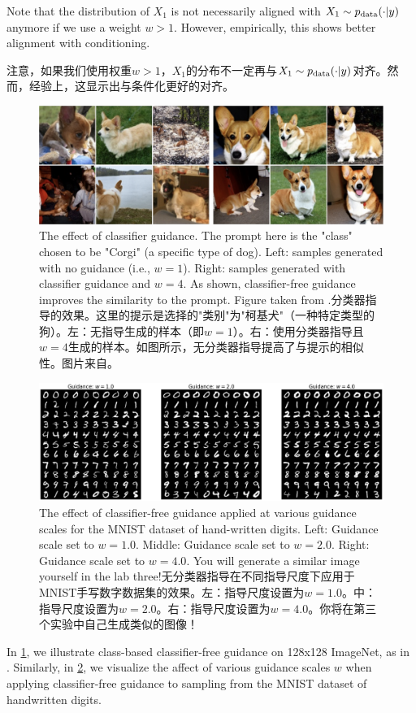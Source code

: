 Note that the distribution of $X_1$ is not necessarily aligned with $X_1 \sim  p_{\rm{data}}(\cdot | y)$ anymore if we use a weight $w>1$. However, empirically, this shows better alignment with conditioning.

注意，如果我们使用权重$w>1$，$X_1$的分布不一定再与$X_1 \sim  p_{\rm{data}}(\cdot | y)$对齐。然而，经验上，这显示出与条件化更好的对齐。
\begin{figure}[!t]
    \centering
    \includegraphics[width=\linewidth]{figures/salimans_cfg.png}
    \caption{The effect of classifier guidance. The prompt here is the "class" chosen to be "Corgi" (a specific type of dog). Left: samples generated with no guidance (i.e., $w = 1$). Right: samples generated with classifier guidance and $w = 4$. As shown, classifier-free guidance improves the similarity to the prompt. Figure taken from \cite{cfg}.分类器指导的效果。这里的提示是选择的"类别"为"柯基犬"（一种特定类型的狗）。左：无指导生成的样本（即$w = 1$）。右：使用分类器指导且$w = 4$生成的样本。如图所示，无分类器指导提高了与提示的相似性。图片来自\cite{cfg}。}
    \label{fig:guidance}
\end{figure}

\begin{figure}[!t]
    \centering
    \includegraphics[width=\linewidth]{figures/guidance.png}
    \caption{The effect of classifier-free guidance applied at various guidance scales for the MNIST dataset of hand-written digits. Left: Guidance scale set to $w = 1.0$. Middle: Guidance scale set to $w = 2.0$. Right: Guidance scale set to $w = 4.0$. You will generate a similar image yourself in the lab three!无分类器指导在不同指导尺度下应用于MNIST手写数字数据集的效果。左：指导尺度设置为$w = 1.0$。中：指导尺度设置为$w = 2.0$。右：指导尺度设置为$w = 4.0$。你将在第三个实验中自己生成类似的图像！}
    \label{fig:mnist_guidance}
\end{figure}
In \cref{fig:guidance}, we illustrate class-based classifier-free guidance on 128x128 ImageNet, as in \cite{cfg}. Similarly, in \cref{fig:mnist_guidance}, we visualize the affect of various guidance scales $w$ when applying classifier-free guidance to sampling from the MNIST dataset of handwritten digits.

